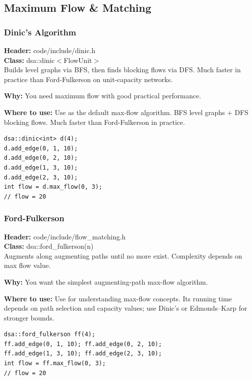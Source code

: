 \documentclass[11pt]{article}
\begin{document}
\subsection{Maximum Flow \& Matching}

\subsubsection{Dinic's Algorithm}
\textbf{Header:} code/include/dinic.h\\
\textbf{Class:} dsa::dinic$<$FlowUnit$>$\\

Builds level graphs via BFS, then finds blocking flows via DFS. Much faster in practice than Ford-Fulkerson on unit-capacity networks.

\textbf{Why:} You need maximum flow with good practical performance. \par \textbf{Where to use:} Use as the default max-flow algorithm. BFS level graphs + DFS blocking flows. Much faster than Ford-Fulkerson in practice.

\begin{lstlisting}
dsa::dinic<int> d(4);
d.add_edge(0, 1, 10);
d.add_edge(0, 2, 10);
d.add_edge(1, 3, 10);
d.add_edge(2, 3, 10);
int flow = d.max_flow(0, 3);
// flow = 20
\end{lstlisting}

\subsubsection{Ford-Fulkerson}
\textbf{Header:} code/include/flow\_matching.h\\
\textbf{Class:} dsa::ford\_fulkerson(n)\\

Augments along augmenting paths until no more exist. Complexity depends on max flow value.

\textbf{Why:} You want the simplest augmenting-path max-flow algorithm. \par \textbf{Where to use:} Use for understanding max-flow concepts. Its running time depends on path selection and capacity values; use Dinic's or Edmonds--Karp for stronger bounds.

\begin{lstlisting}
dsa::ford_fulkerson ff(4);
ff.add_edge(0, 1, 10); ff.add_edge(0, 2, 10);
ff.add_edge(1, 3, 10); ff.add_edge(2, 3, 10);
int flow = ff.max_flow(0, 3);
// flow = 20
\end{lstlisting}
\end{document}
